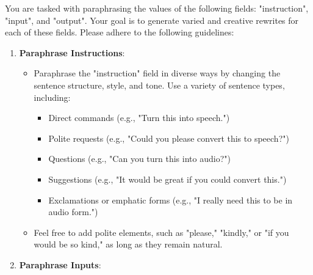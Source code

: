 \begin{tcolorbox}[
    colframe=black,  %
    colback=white,   %
    boxrule=0.5mm,    %
    arc=0mm,          %
    sharp corners,     %
    breakable
]

You are tasked with paraphrasing the values of the following fields: "instruction", "input", and "output". Your goal is to generate varied and creative rewrites for each of these fields. Please adhere to the following guidelines:

\begin{enumerate}
    \item \textbf{Paraphrase Instructions}:
    \begin{itemize}
        \item Paraphrase the "instruction" field in diverse ways by changing the sentence structure, style, and tone. Use a variety of sentence types, including:
        \begin{itemize}
            \item Direct commands (e.g., "Turn this into speech.")
            \item Polite requests (e.g., "Could you please convert this to speech?")
            \item Questions (e.g., "Can you turn this into audio?")
            \item Suggestions (e.g., "It would be great if you could convert this.")
            \item Exclamations or emphatic forms (e.g., "I really need this to be in audio form.")
        \end{itemize}
        \item Feel free to add polite elements, such as "please," "kindly," or "if you would be so kind," as long as they remain natural.
    \end{itemize}

    \item \textbf{Paraphrase Inputs}:
   

\end{enumerate}
\end{tcolorbox}
